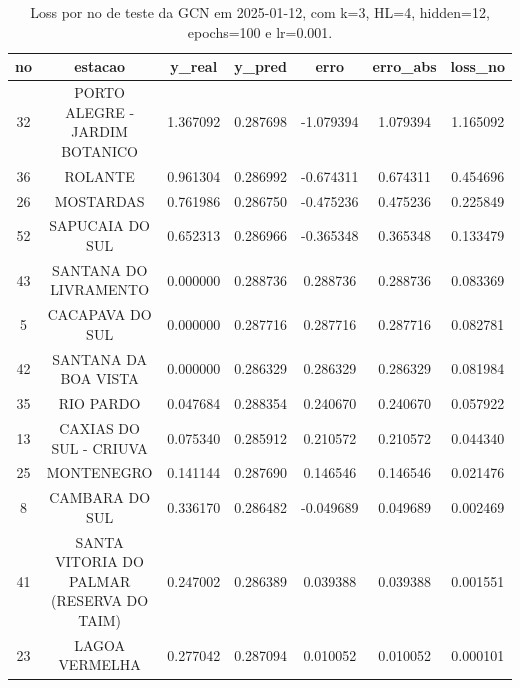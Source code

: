 \begin{table}[h]
\centering
\caption{Loss por no de teste da GCN em 2025-01-12, com k=3, HL=4, hidden=12, epochs=100 e lr=0.001.}
\label{tab:gcn_loss_k3_hl4_h12_e100_d20250112}
\begin{tabular}{ccccccc}
\toprule
no & estacao & y\_real & y\_pred & erro & erro\_abs & loss\_no \\
\midrule
32 & PORTO ALEGRE - JARDIM BOTANICO & 1.367092 & 0.287698 & -1.079394 & 1.079394 & 1.165092 \\
36 & ROLANTE & 0.961304 & 0.286992 & -0.674311 & 0.674311 & 0.454696 \\
26 & MOSTARDAS & 0.761986 & 0.286750 & -0.475236 & 0.475236 & 0.225849 \\
52 & SAPUCAIA DO SUL & 0.652313 & 0.286966 & -0.365348 & 0.365348 & 0.133479 \\
43 & SANTANA DO LIVRAMENTO & 0.000000 & 0.288736 & 0.288736 & 0.288736 & 0.083369 \\
5 & CACAPAVA DO SUL & 0.000000 & 0.287716 & 0.287716 & 0.287716 & 0.082781 \\
42 & SANTANA DA BOA VISTA & 0.000000 & 0.286329 & 0.286329 & 0.286329 & 0.081984 \\
35 & RIO PARDO & 0.047684 & 0.288354 & 0.240670 & 0.240670 & 0.057922 \\
13 & CAXIAS DO SUL - CRIUVA & 0.075340 & 0.285912 & 0.210572 & 0.210572 & 0.044340 \\
25 & MONTENEGRO & 0.141144 & 0.287690 & 0.146546 & 0.146546 & 0.021476 \\
8 & CAMBARA DO SUL & 0.336170 & 0.286482 & -0.049689 & 0.049689 & 0.002469 \\
41 & SANTA VITORIA DO PALMAR (RESERVA DO TAIM) & 0.247002 & 0.286389 & 0.039388 & 0.039388 & 0.001551 \\
23 & LAGOA VERMELHA & 0.277042 & 0.287094 & 0.010052 & 0.010052 & 0.000101 \\
\bottomrule
\end{tabular}
\end{table}
